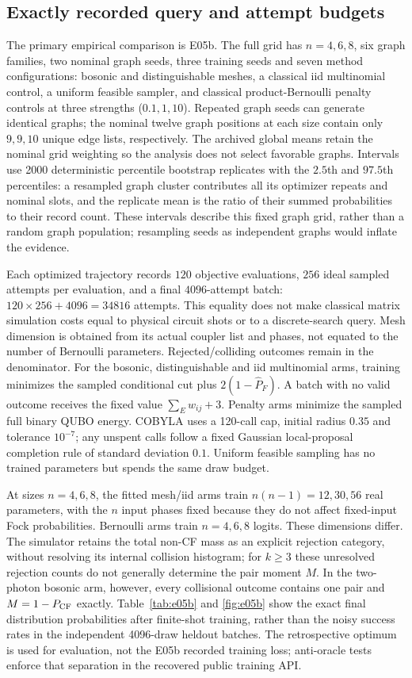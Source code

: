 \subsection{Exactly recorded query and attempt budgets}
The primary empirical comparison is E05b. The full grid has $n=4,6,8$, six graph families, two nominal graph seeds, three training seeds and seven method configurations: bosonic and distinguishable meshes, a classical iid multinomial control, a uniform feasible sampler, and classical product-Bernoulli penalty controls at three strengths ($0.1,1,10$). Repeated graph seeds can generate identical graphs; the nominal twelve graph positions at each size contain only $9,9,10$ unique edge lists, respectively. The archived global means retain the nominal grid weighting so the analysis does not select favorable graphs. Intervals use 2000 deterministic percentile bootstrap replicates with the $2.5$th and $97.5$th percentiles: a resampled graph cluster contributes all its optimizer repeats and nominal slots, and the replicate mean is the ratio of their summed probabilities to their record count. These intervals describe this fixed graph grid, rather than a random graph population; resampling seeds as independent graphs would inflate the evidence.

Each optimized trajectory records $120$ objective evaluations, $256$ ideal sampled attempts per evaluation, and a final $4096$-attempt batch: $120\times256+4096=34816$ attempts. This equality does not make classical matrix simulation costs equal to physical circuit shots or to a discrete-search query. Mesh dimension is obtained from its actual coupler list and phases, not equated to the number of Bernoulli parameters. Rejected/colliding outcomes remain in the denominator. For the bosonic, distinguishable and iid multinomial arms, training minimizes the sampled conditional cut plus $2(1-\widehat P_F)$. A batch with no valid outcome receives the fixed value $\sum_E w_{ij}+3$. Penalty arms minimize the sampled full binary QUBO energy. COBYLA uses a 120-call cap, initial radius $0.35$ and tolerance $10^{-7}$; any unspent calls follow a fixed Gaussian local-proposal completion rule of standard deviation $0.1$. Uniform feasible sampling has no trained parameters but spends the same draw budget.

At sizes $n=4,6,8$, the fitted mesh/iid arms train $n(n-1)=12,30,56$ real parameters, with the $n$ input phases fixed because they do not affect fixed-input Fock probabilities. Bernoulli arms train $n=4,6,8$ logits. These dimensions differ. The simulator retains the total non-CF mass as an explicit rejection category, without resolving its internal collision histogram; for $k\ge3$ these unresolved rejection counts do not generally determine the pair moment $M$. In the two-photon bosonic arm, however, every collisional outcome contains one pair and $M=1-P_{\mathrm{CF}}$ exactly. Table~\ref{tab:e05b} and \cref{fig:e05b} show the exact final distribution probabilities after finite-shot training, rather than the noisy success rates in the independent 4096-draw heldout batches. The retrospective optimum is used for evaluation, not the E05b recorded training loss; anti-oracle tests enforce that separation in the recovered public training API.

